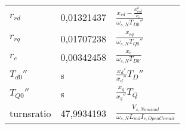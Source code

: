 \begin{longtable}[]{@{}lll@{}}
\begin{minipage}[t]{0.10\columnwidth}\raggedright
\(r_{rd}\)\strut
\end{minipage} & \begin{minipage}[t]{0.25\columnwidth}\raggedright
0,01321437\strut
\end{minipage} & \begin{minipage}[t]{0.55\columnwidth}\raggedright
\(\frac{x_{rd}-\frac{x_{md}^2}{x_e}}{\omega_{s,N}T_{D0}''}\)\strut
\end{minipage}\tabularnewline
\begin{minipage}[t]{0.10\columnwidth}\raggedright
\(r_{rq}\)\strut
\end{minipage} & \begin{minipage}[t]{0.25\columnwidth}\raggedright
0,01707238\strut
\end{minipage} & \begin{minipage}[t]{0.55\columnwidth}\raggedright
\(\frac{x_{rq}}{\omega_{s,N}T_{Q0}''}\)\strut
\end{minipage}\tabularnewline
\begin{minipage}[t]{0.10\columnwidth}\raggedright
\(r_e\)\strut
\end{minipage} & \begin{minipage}[t]{0.25\columnwidth}\raggedright
0,00342458\strut
\end{minipage} & \begin{minipage}[t]{0.55\columnwidth}\raggedright
\(\frac{x_e}{\omega_{s,N}T_{D0'}}\)\strut
\end{minipage}\tabularnewline
\begin{minipage}[t]{0.10\columnwidth}\raggedright
\(T_{d0}''\)\strut
\end{minipage} & \begin{minipage}[t]{0.25\columnwidth}\raggedright
\unit[0,00651784]{s}\strut
\end{minipage} & \begin{minipage}[t]{0.55\columnwidth}\raggedright
\(\frac{x_d'}{x_d''}T_D''\)\strut
\end{minipage}\tabularnewline
\begin{minipage}[t]{0.10\columnwidth}\raggedright
\(T_{Q0}''\)\strut
\end{minipage} & \begin{minipage}[t]{0.25\columnwidth}\raggedright
\unit[0,00756537]{s}\strut
\end{minipage} & \begin{minipage}[t]{0.55\columnwidth}\raggedright
\(\frac{x_q}{x_q''}T_Q\)\strut
\end{minipage}\tabularnewline
\begin{minipage}[t]{0.10\columnwidth}\raggedright
turnsratio\strut
\end{minipage} & \begin{minipage}[t]{0.25\columnwidth}\raggedright
47,9934193\strut
\end{minipage} & \begin{minipage}[t]{0.55\columnwidth}\raggedright
\(\frac{V_{s,Nominal}}{\omega_{s,N}L_{md}I_{e,OpenCircuit}}\)\strut
\end{minipage}\tabularnewline
\bottomrule
\end{longtable}

